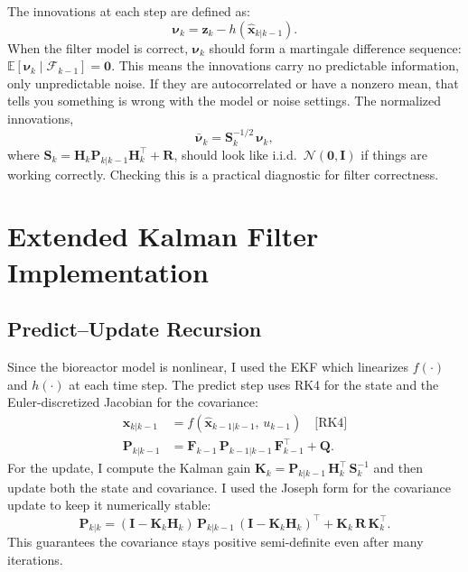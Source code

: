 \documentclass[11pt,letterpaper]{article}
\newcommand{\bx}{\mathbf{x}}
\newcommand{\bz}{\mathbf{z}}
\newcommand{\bK}{\mathbf{K}}
\newcommand{\bH}{\mathbf{H}}
\newcommand{\bF}{\mathbf{F}}
\newcommand{\bP}{\mathbf{P}}
\newcommand{\bQ}{\mathbf{Q}}
\newcommand{\bR}{\mathbf{R}}
\newcommand{\bI}{\mathbf{I}}
\newcommand{\Filt}{\mathcal{F}}
\begin{document}
The innovations at each step are defined as:
\begin{equation}
    \boldsymbol{\nu}_k = \bz_k - h\!\left(\hat{\bx}_{k|k-1}\right).
    \label{eq:innov}
\end{equation}
When the filter model is correct, $\boldsymbol{\nu}_k$ should form a martingale difference
sequence: $\mathbb{E}[\boldsymbol{\nu}_k \mid \Filt_{k-1}] = \mathbf{0}$. This means the
innovations carry no predictable information, only unpredictable noise. If they are autocorrelated
or have a nonzero mean, that tells you something is wrong with the model or noise settings.
The normalized innovations,
\begin{equation}
    \bar{\boldsymbol{\nu}}_k = \mathbf{S}_k^{-1/2}\,\boldsymbol{\nu}_k,
    \label{eq:norm_innov}
\end{equation}
where $\mathbf{S}_k = \bH_k \bP_{k|k-1} \bH_k^\top + \bR$, should look like i.i.d.\
$\mathcal{N}(\mathbf{0}, \mathbf{I})$ if things are working correctly. Checking this is a
practical diagnostic for filter correctness.

\section{Extended Kalman Filter Implementation}
\label{sec:ekf}

\subsection{Predict--Update Recursion}

Since the bioreactor model is nonlinear, I used the EKF which linearizes $f(\cdot)$ and
$h(\cdot)$ at each time step. The predict step uses RK4 for the state and the Euler-discretized
Jacobian for the covariance:
\begin{align}
    \hat{\bx}_{k|k-1} &= f\!\left(\hat{\bx}_{k-1|k-1},\, u_{k-1}\right) \quad\text{[RK4]}
    \label{eq:predict_x}\\
    \bP_{k|k-1}       &= \bF_{k-1}\,\bP_{k-1|k-1}\,\bF_{k-1}^\top + \bQ.
    \label{eq:predict_P}
\end{align}
For the update, I compute the Kalman gain
$\bK_k = \bP_{k|k-1}\,\bH_k^\top\,\mathbf{S}_k^{-1}$
and then update both the state and covariance. I used the Joseph form for the covariance update
to keep it numerically stable:
\begin{equation}
    \bP_{k|k} = (\bI - \bK_k \bH_k)\,\bP_{k|k-1}\,(\bI - \bK_k \bH_k)^\top
                + \bK_k\,\bR\,\bK_k^\top.
    \label{eq:joseph}
\end{equation}
This guarantees the covariance stays positive semi-definite even after many iterations.
\end{document}

